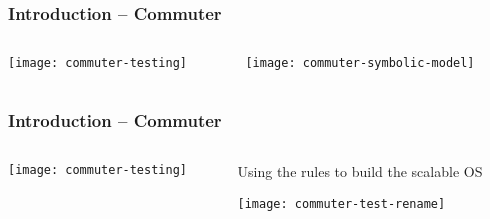 \begin{frame}[plain]
	\frametitle{Introduction -- Commuter}
	
	
	\begin{columns}
		
		\begin{column}{.3\textwidth}	
			
			\texttt{[image: commuter-testing]}

			
		\end{column}
		
		\begin{column}{.7\textwidth}

			\centering
			
			\texttt{[image: commuter-symbolic-model]}
			
		\end{column}
		
	\end{columns}
	
	
\end{frame}	


\begin{frame}[plain]
	\frametitle{Introduction -- Commuter}
	
	
	\begin{columns}
		
		\begin{column}{.3\textwidth}	
			
			\texttt{[image: commuter-testing]}
			
			
		\end{column}
		
		\begin{column}{.7\textwidth}
			 Using the rules to build the scalable OS
			\centering
			
			\texttt{[image: commuter-test-rename]}
			
		\end{column}
		
	\end{columns}
	
	
\end{frame}	


